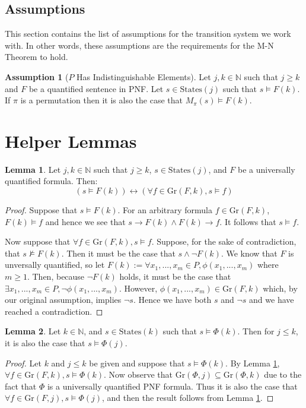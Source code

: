 \documentclass[12pt]{article}
\theoremstyle{definition}
\newtheorem{assumption}{Assumption}
\newtheorem{lemma}{Lemma}
\theoremstyle{remark}
\newcommand{\states}{\text{States}}
\newcommand{\gr}{\text{Gr}}
\begin{document}
\subsection{Assumptions}
This section contains the list of assumptions for the transition system we work with.  In other words, these assumptions are the requirements for the M-N Theorem to hold.
\begin{assumption}[$P$ Has Indistinguishable Elements]
  \label{asmp:indist}
  Let $j,k \in \mathbb{N}$ such that $j \geq k$ and $F$ be a quantified sentence in PNF.  Let $s \in \states(j)$ such that $s \models F(k)$.  If $\pi$ is a permutation then it is also the case that $M_\pi(s) \models F(k)$.
\end{assumption}



\section{Helper Lemmas}

\begin{lemma}
  \label{lem:pnf-ground}
  Let $j,k \in \mathbb{N}$ such that $j \geq k$, $s \in \states(j)$, and $F$ be a universally quantified formula.  Then:
  $$(s \models F(k)) \leftrightarrow (\forall f \in \gr(F,k), s \models f)$$
\end{lemma}
\begin{proof}
  Suppose that $s \models F(k)$.  For an arbitrary formula $f \in \gr(F,k)$, $F(k) \models f$ and hence we see that $s \rightarrow F(k) \land F(k) \rightarrow f$.  It follows that $s \models f$.

  Now suppose that $\forall f \in \gr(F,k), s \models f$.  Suppose, for the sake of contradiction, that $s \not\models F(k)$.  Then it must be the case that $s \land \neg F(k)$.  We know that $F$ is unversally quantified, so let $F(k) := \forall x_1,...,x_m \in P, \phi(x_1,...,x_m)$ where $m \geq 1$.  Then, because $\neg F(k)$ holds, it must be the case that $\exists x_1,...,x_m \in P, \neg \phi(x_1,...,x_m)$.  However, $\phi(x_1,...,x_m) \in \gr(F,k)$ which, by our original assumption, implies $\neg s$.  Hence we have both $s$ and $\neg s$ and we have reached a contradiction.
\end{proof}

\begin{lemma}
  \label{lem:lt-sat}
  Let $k \in \mathbb{N}$, and $s \in \states(k)$ such that $s \models \Phi(k)$.  Then for $j \leq k$, it is also the case that $s \models \Phi(j)$.
\end{lemma}
\begin{proof}
  Let $k$ and $j \leq k$ be given and suppose that $s \models \Phi(k)$.  By Lemma \ref{lem:pnf-ground}, $\forall f \in \gr(F,k), s \models \Phi(k)$.  Now observe that $\gr(\Phi,j) \subseteq \gr(\Phi,k)$ due to the fact that $\Phi$ is a universally quantified PNF formula.  Thus it is also the case that $\forall f \in \gr(F,j), s \models \Phi(j)$, and then the result follows from Lemma \ref{lem:pnf-ground}.
\end{proof}
\end{document}

